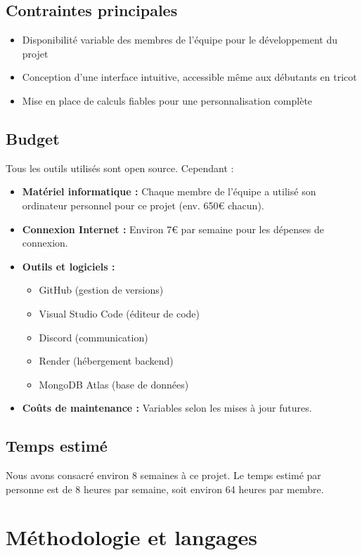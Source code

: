 \documentclass{article}
\begin{document}
\subsection*{Contraintes principales}
\begin{itemize}
    \item Disponibilité variable des membres de l’équipe pour le développement du projet
    \item Conception d’une interface intuitive, accessible même aux débutants en tricot
    \item Mise en place de calculs fiables pour une personnalisation complète
\end{itemize}

\subsection{Budget}
Tous les outils utilisés sont open source. Cependant :
\begin{itemize}
    \item \textbf{Matériel informatique :}  Chaque membre de l’équipe a utilisé son ordinateur personnel pour ce projet (env. 650€ chacun).
    \item \textbf{Connexion Internet :} Environ 7€ par semaine pour les dépenses de connexion.
    \item \textbf{Outils et logiciels :}
    \begin{itemize}
        \item GitHub (gestion de versions)
        \item Visual Studio Code (éditeur de code)
        \item Discord (communication)
        \item Render (hébergement backend)
        \item MongoDB Atlas (base de données)
    \end{itemize}
    \item \textbf{Coûts de maintenance :} Variables selon les mises à jour futures.
\end{itemize}

\subsection{Temps estimé}
Nous avons consacré environ 8 semaines à ce projet. Le temps estimé par personne est de 8 heures par semaine, soit environ 64 heures par membre.

\section{Méthodologie et langages}
\end{document}
